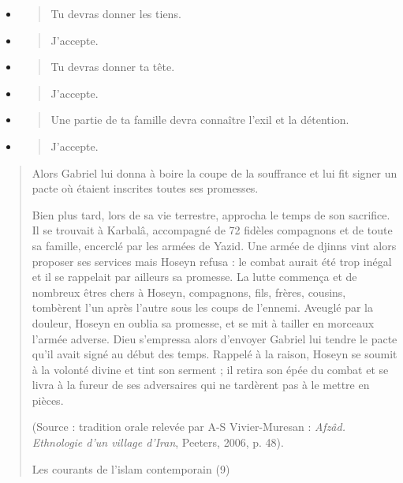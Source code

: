 \begin{itemize}
\item
  \begin{quote}
  Tu devras donner les tiens.
  \end{quote}
\item
  \begin{quote}
  J'accepte.
  \end{quote}
\item
  \begin{quote}
  Tu devras donner ta tête.
  \end{quote}
\item
  \begin{quote}
  J'accepte.
  \end{quote}
\item
  \begin{quote}
  Une partie de ta famille devra connaître l'exil et la détention.
  \end{quote}
\item
  \begin{quote}
  J'accepte.
  \end{quote}
\end{itemize}

\begin{quote}
Alors Gabriel lui donna à boire la coupe de la souffrance et lui fit
signer un pacte où étaient inscrites toutes ses promesses.

Bien plus tard, lors de sa vie terrestre, approcha le temps de son
sacrifice. Il se trouvait à Karbalâ, accompagné de 72 fidèles compagnons
et de toute sa famille, encerclé par les armées de Yazid. Une armée de
djinns vint alors proposer ses services mais Hoseyn refusa : le combat
aurait été trop inégal et il se rappelait par ailleurs sa promesse. La
lutte commença et de nombreux êtres chers à Hoseyn, compagnons, fils,
frères, cousins, tombèrent l'un après l'autre sous les coups de
l'ennemi. Aveuglé par la douleur, Hoseyn en oublia sa promesse, et se
mit à tailler en morceaux l'armée adverse. Dieu s'empressa alors
d'envoyer Gabriel lui tendre le pacte qu'il avait signé au début des
temps. Rappelé à la raison, Hoseyn se soumit à la volonté divine et tint
son serment ; il retira son épée du combat et se livra à la fureur de
ses adversaires qui ne tardèrent pas à le mettre en pièces.

(Source : tradition orale relevée par A-S Vivier-Muresan : \emph{Afzâd.
Ethnologie d'un village d'Iran}, Peeters, 2006, p. 48).

Les courants de l'islam contemporain (9)
\end{quote}

